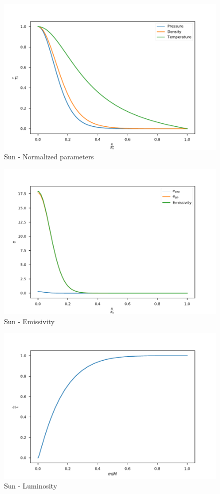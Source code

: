 \documentclass{aa}
\begin{document}
\begin{figure}
  \centering
  \includegraphics[width=\linewidth]{../figures/parameters_sun.pdf}
  \caption{Sun - Normalized parameters}
  \label{fig:sun_params}
\end{figure}
\begin{figure}
  \centering
  \includegraphics[width=\linewidth]{../figures/emissivity_sun.pdf}
  \caption{Sun - Emissivity}
  \label{fig:sun_emissivity}
\end{figure}
\begin{figure}
  \centering
  \includegraphics[width=\linewidth]{../figures/L_vs_M_sun.pdf}
  \caption{Sun - Luminosity}
  \label{fig:sun_luminosity}
\end{figure}
\end{document}
